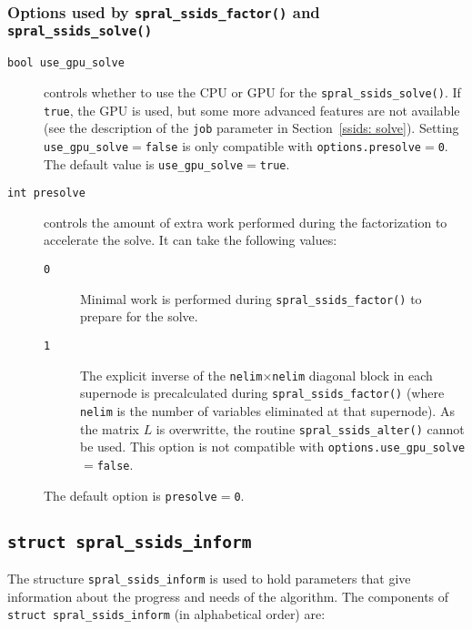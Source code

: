 \subsubsection*{Options used by {\tt spral\_ssids\_factor()} and {\tt spral\_ssids\_solve()}}

\begin{description}
\item[\texttt{bool use\_gpu\_solve}] controls
   whether to use the CPU or GPU for the \texttt{spral\_ssids\_solve()}. If
   \texttt{true}, the GPU is used, but some more advanced features are not
   available (see the description of the \texttt{job} parameter in
   Section~\ref{ssids: solve}).
   Setting \texttt{use\_gpu\_solve}$=${\tt false} is only compatible with
   \texttt{options.presolve}$=${\tt 0}.
   The default value is \texttt{use\_gpu\_solve}$=$\texttt{true}.
\item[\texttt{int presolve}] controls the
   amount of extra work performed during the factorization to accelerate the solve.
   It can take the following values:
   \begin{description}
      \item[\texttt{0}] Minimal work is performed during {\tt spral\_ssids\_factor()}
         to prepare for the solve.
      \item[\texttt{1}] The explicit inverse of the
         \texttt{nelim}$\times$\texttt{nelim} diagonal block in each supernode is
         precalculated during {\tt spral\_ssids\_factor()} (where \texttt{nelim} is
         the number of variables eliminated at that supernode). As the matrix
         $L$ is overwritte, the routine {\tt spral\_ssids\_alter()} cannot be
         used.
         This option is not compatible with {\tt options.use\_gpu\_solve}$=$\texttt{false}.
   \end{description}
   The default option is \texttt{presolve}$=$\texttt{0}.
\end{description}


\subsection{\texttt{struct spral\_ssids\_inform}}
\label{ssids: typeinform}
The structure {\tt spral\_ssids\_inform}
is used to hold parameters that give information about the progress and needs
of the algorithm. The components of {\tt struct spral\_ssids\_inform}
(in alphabetical order) are:

